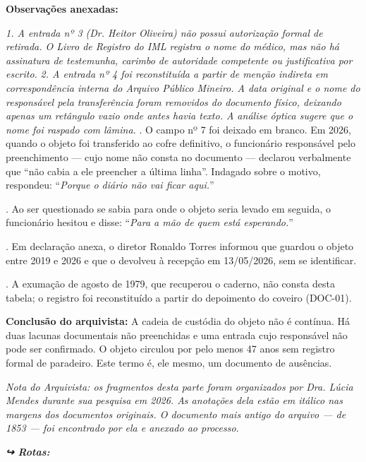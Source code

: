 \noindent \textbf{Observações anexadas:}

\noindent \textit{1. A entrada nº 3 (Dr. Heitor Oliveira) não possui autorização formal de retirada. O Livro de Registro do IML registra o nome do médico, mas não há assinatura de testemunha, carimbo de autoridade competente ou justificativa por escrito.}
\noindent \textit{2. A entrada nº 4 foi reconstituída a partir de menção indireta em correspondência interna do Arquivo Público Mineiro. A data original e o nome do responsável pela transferência foram removidos do documento físico, deixando apenas um retângulo vazio onde antes havia texto. A análise óptica sugere que o nome foi raspado com lâmina.}
. O campo nº 7 foi deixado em branco. Em 2026, quando o objeto foi transferido ao cofre definitivo, o funcionário responsável pelo preenchimento — cujo nome não consta no documento — declarou verbalmente que ``não cabia a ele preencher a última linha''. Indagado sobre o motivo, respondeu: \textquotedblleft{}\textit{Porque o diário não vai ficar aqui.}\textquotedblright{}

. Ao ser questionado se sabia para onde o objeto seria levado em seguida, o funcionário hesitou e disse: \textquotedblleft{}\textit{Para a mão de quem está esperando.}\textquotedblright{}

. Em declaração anexa, o diretor Ronaldo Torres informou que guardou o objeto entre 2019 e 2026 e que o devolveu à recepção em 13/05/2026, sem se identificar.

. A exumação de agosto de 1979, que recuperou o caderno, não consta desta tabela; o registro foi reconstituído a partir do depoimento do coveiro (DOC-01).

\noindent \textbf{Conclusão do arquivista:}
\noindent A cadeia de custódia do objeto não é contínua. Há duas lacunas documentais não preenchidas e uma entrada cujo responsável não pode ser confirmado. O objeto circulou por pelo menos 47 anos sem registro formal de paradeiro.
\noindent Este termo é, ele mesmo, um documento de ausências.

\noindent \textit{Nota do Arquivista: os fragmentos desta parte foram organizados por Dra. Lúcia Mendes durante sua pesquisa em 2026. As anotações dela estão em itálico nas margens dos documentos originais. O documento mais antigo do arquivo --- de 1853 --- foi encontrado por ela e anexado ao processo.}

\vspace{0.5em}
\noindent\textit{\textbf{↪ Rotas:}  \rotasep {}}
